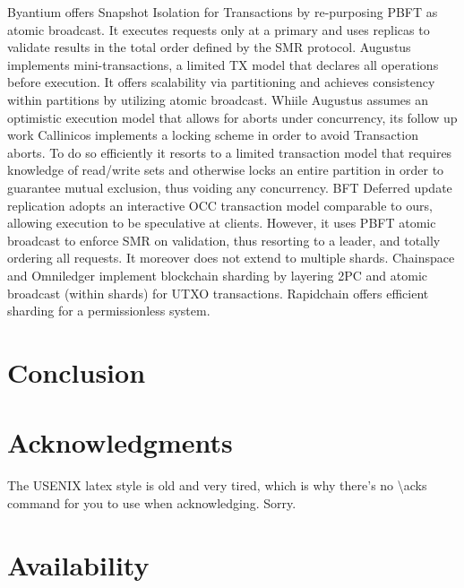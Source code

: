 Byantium offers Snapshot Isolation for Transactions by re-purposing PBFT as atomic broadcast. It executes requests only at a primary and uses replicas to validate results in the total order defined by the SMR protocol. Augustus implements mini-transactions, a limited TX model that declares all operations before execution. It offers scalability via partitioning and achieves consistency within partitions by utilizing atomic broadcast. Whiile Augustus assumes an optimistic execution model that allows for aborts under concurrency, its follow up work Callinicos implements a locking scheme in order to avoid Transaction aborts. To do so efficiently it resorts to a limited transaction model that requires knowledge of read/write sets and otherwise locks an entire partition in order to guarantee mutual exclusion, thus voiding any concurrency. BFT Deferred update replication adopts an interactive OCC transaction model comparable to ours, allowing execution to be speculative at clients. However, it uses PBFT atomic broadcast to enforce SMR on validation, thus resorting to a leader, and totally ordering all requests. It moreover does not extend to multiple shards.
Chainspace and Omniledger implement blockchain sharding by layering 2PC and atomic broadcast (within shards) for UTXO transactions. Rapidchain offers efficient sharding for a permissionless system. 

\cite{kotla2007zyzzyva}

\section{Conclusion}


\section*{Acknowledgments}

The USENIX latex style is old and very tired, which is why
there's no \textbackslash{}acks command for you to use when
acknowledging. Sorry.

\section*{Availability}

